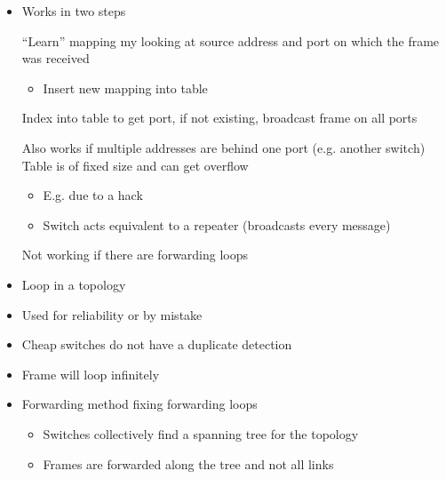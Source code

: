 \begin{itemize}
\begin{itemize}
\begin{itemize}
                    \item Works in two steps
                        \begin{itemize}
                             ``Learn'' mapping my looking at source address and port on which the frame was received
                                \begin{itemize}
                                    \item Insert new mapping into table
                                \end{itemize}
                             Index into table to get port, if not existing, broadcast frame on all ports
                        \end{itemize}
                    \ipro Also works if multiple addresses are behind one port (e.g. another switch)
                    \icon Table is of fixed size and can get overflow
                        \begin{itemize}
                            \item E.g. due to a hack
                            \item Switch acts equivalent to a repeater (broadcasts every message)
                        \end{itemize}
                    \icon Not working if there are forwarding loops
                \end{itemize}
                \begin{itemize}
                    \item Loop in a topology
                    \item Used for reliability or by mistake
                    \item Cheap switches do not have a duplicate detection
                    \item Frame will loop infinitely
                \end{itemize}
                \begin{itemize}
                    \item Forwarding method fixing forwarding loops
                        \begin{itemize}
                            \item Switches collectively find a spanning tree for the topology
                            \item Frames are forwarded along the tree and not all links

\end{itemize}
\end{itemize}
\end{itemize}
\end{itemize}
